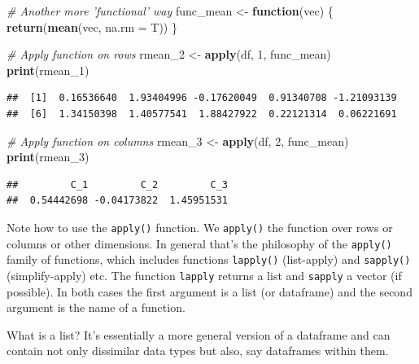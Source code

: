 \documentclass[12pt,]{article}
\newenvironment{Shaded}{\begin{snugshade}}{\end{snugshade}}
\newcommand{\KeywordTok}[1]{\textcolor[rgb]{0.13,0.29,0.53}{\textbf{#1}}}
\newcommand{\DataTypeTok}[1]{\textcolor[rgb]{0.13,0.29,0.53}{#1}}
\newcommand{\DecValTok}[1]{\textcolor[rgb]{0.00,0.00,0.81}{#1}}
\newcommand{\StringTok}[1]{\textcolor[rgb]{0.31,0.60,0.02}{#1}}
\newcommand{\CommentTok}[1]{\textcolor[rgb]{0.56,0.35,0.01}{\textit{#1}}}
\newcommand{\ControlFlowTok}[1]{\textcolor[rgb]{0.13,0.29,0.53}{\textbf{#1}}}
\newcommand{\NormalTok}[1]{#1}
\begin{document}
\begin{Shaded}
\begin{Highlighting}[]
\CommentTok{# Another more 'functional' way}
\NormalTok{func_mean <-}\StringTok{ }\ControlFlowTok{function}\NormalTok{(vec)}
\NormalTok{\{}
  \KeywordTok{return}\NormalTok{(}\KeywordTok{mean}\NormalTok{(vec, }\DataTypeTok{na.rm =}\NormalTok{ T))}
\NormalTok{\}}

\CommentTok{# Apply function on rows}
\NormalTok{rmean_}\DecValTok{2}\NormalTok{ <-}\StringTok{ }\KeywordTok{apply}\NormalTok{(df, }\DecValTok{1}\NormalTok{, func_mean) }
\KeywordTok{print}\NormalTok{(rmean_}\DecValTok{1}\NormalTok{)}
\end{Highlighting}
\end{Shaded}

\begin{verbatim}
##  [1]  0.16536640  1.93404996 -0.17620049  0.91340708 -1.21093139
##  [6]  1.34150398  1.40577541  1.88427922  0.22121314  0.06221691
\end{verbatim}

\begin{Shaded}
\begin{Highlighting}[]
\CommentTok{# Apply function on columns}
\NormalTok{rmean_}\DecValTok{3}\NormalTok{ <-}\StringTok{ }\KeywordTok{apply}\NormalTok{(df, }\DecValTok{2}\NormalTok{, func_mean)}
\KeywordTok{print}\NormalTok{(rmean_}\DecValTok{3}\NormalTok{)}
\end{Highlighting}
\end{Shaded}

\begin{verbatim}
##         C_1         C_2         C_3 
##  0.54442698 -0.04173822  1.45951531
\end{verbatim}

Note how to use the \texttt{apply()} function. We \texttt{apply()} the
function over rows or columns or other dimensions. In general that's the
philosophy of the \texttt{apply()} family of functions, which includes
functions \texttt{lapply()} (list-apply) and \texttt{sapply()}
(simplify-apply) etc. The function \texttt{lapply} returns a list and
\texttt{sapply} a vector (if possible). In both cases the first argument
is a list (or dataframe) and the second argument is the name of a
function.

What is a list? It's essentially a more general version of a dataframe
and can contain not only dissimilar data types but also, say dataframes
within them.
\end{document}
